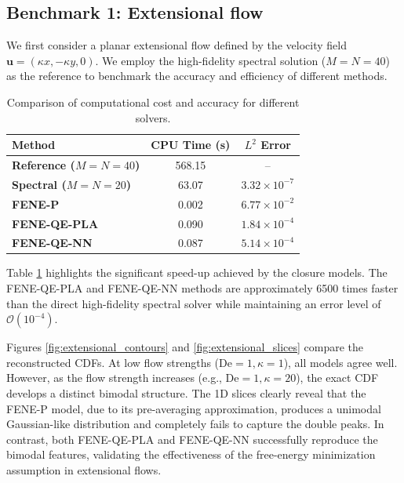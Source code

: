 \documentclass[preprint,12pt]{elsarticle}
\begin{document}
\subsection{Benchmark 1: Extensional flow}
We first consider a planar extensional flow defined by the velocity field $\bm{u}=(\kappa x,-\kappa y, 0)$. We employ the high-fidelity spectral solution ($M=N=40$) as the reference to benchmark the accuracy and efficiency of different methods.

\begin{table}[htbp]
    \centering
    \caption{Comparison of computational cost and accuracy for different solvers.}
    \label{tab:time}
    \begin{tabular}{lcc}
        \toprule
        \textbf{Method} & \textbf{CPU Time (s)} & \textbf{$L^2$ Error}\\
        \midrule
        \textbf{Reference ($M=N=40$)} & 568.15 & -- \\
        \textbf{Spectral ($M=N=20$)} & 63.07 & $3.32 \times 10^{-7}$ \\
        \textbf{FENE-P} & 0.002 & $6.77 \times 10^{-2}$ \\
        \textbf{FENE-QE-PLA} & 0.090 & $1.84 \times 10^{-4}$ \\
        \textbf{FENE-QE-NN} & 0.087 & $5.14 \times 10^{-4}$ \\
        \bottomrule
    \end{tabular}
\end{table}

Table \ref{tab:time} highlights the significant speed-up achieved by the closure models. The FENE-QE-PLA and FENE-QE-NN methods are approximately 6500 times faster than the direct high-fidelity spectral solver while maintaining an error level of $\mathcal{O}(10^{-4})$.

Figures \ref{fig:extensional_contours} and \ref{fig:extensional_slices} compare the reconstructed CDFs. At low flow strengths ($\mathrm{De}=1, \kappa=1$), all models agree well. However, as the flow strength increases (e.g., $\mathrm{De}=1, \kappa=20$), the exact CDF develops a distinct bimodal structure. The 1D slices clearly reveal that the FENE-P model, due to its pre-averaging approximation, produces a unimodal Gaussian-like distribution and completely fails to capture the double peaks. In contrast, both FENE-QE-PLA and FENE-QE-NN successfully reproduce the bimodal features, validating the effectiveness of the free-energy minimization assumption in extensional flows.
\end{document}
